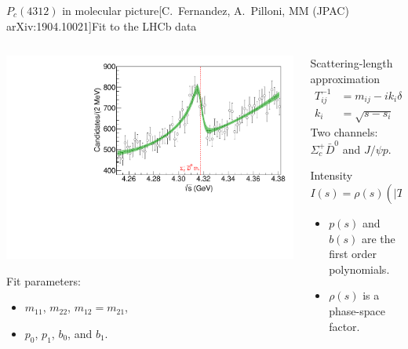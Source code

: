 \documentclass[aspectratio=169]{beamer}
\newcommand{\paper}[1]{{\scriptsize[#1]}}
\begin{document}
\begin{frame}{$P_c(4312)$ in molecular picture\hfill\paper{C.~Fernandez, A.~Pilloni, MM (JPAC) arXiv:1904.10021}}{Fit to the LHCb data}
\begin{columns}
    \begin{column}{0.47\textwidth}
        \begin{center}
            \includegraphics[width=\textwidth]{figs/PcJPAC/plot_nc.pdf}
        \end{center}
        Fit parameters:
        \begin{itemize}
            \item $m_{11}$, $m_{22}$, $m_{12}=m_{21}$,
            \item $p_0$, $p_1$, $b_0$, and $b_1$.
        \end{itemize}
    \end{column}
    \begin{column}{0.47\textwidth}
        \begin{block}{Scattering-length approximation}
            \begin{align*}
                T^{-1}_{ij} &= m_{ij} - i k_i \delta_{ij},\\
                k_i &= \sqrt{s-s_i}
            \end{align*}
            Two channels: $\Sigma_c^+ \bar{D}^0$ and $J/\psi p$.
        \end{block}
        \begin{exampleblock}{Intensity}
            \vspace{-3mm}
            $$
            I(s) = \rho(s)(|T_{11}(s) \,p(s)|^2 + b(s)),
            $$
            \vspace{-5mm}
            \begin{itemize}
                \item $p(s)$ and $b(s)$ are the first order polynomials.
                \item $\rho(s)$ is a phase-space factor.
            \end{itemize}
        \end{exampleblock}
    \end{column}
\end{columns}
\end{frame}
\end{document}
